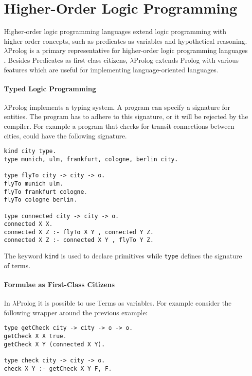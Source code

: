 

\section{Higher-Order Logic Programming}
\label{higher-order-logic-programming}
Higher-order logic programming languages extend logic programming with higher-order concepts, such as predicates as variables and hypothetical reasoning. $\lambda$Prolog is a primary representative for higher-order logic programming languages \cite{miller_programming_2012}. Besides Predicates as first-class citizens, $\lambda$Prolog extends Prolog with various features which are useful for implementing language-oriented languages.


\paragraph{Typed Logic Programming}
$\lambda$Prolog implements a typing system. A program can specify a signature for entities. The program has to adhere to this signature, or it will be rejected by the compiler. For example a program that checks for transit connections between cities, could have the following signature.

\begin{lstlisting}
kind city type.
type munich, ulm, frankfurt, cologne, berlin city.

type flyTo city -> city -> o.
flyTo munich ulm.
flyTo frankfurt cologne.
flyTo cologne berlin.

type connected city -> city -> o.
connected X X.
connected X Z :- flyTo X Y , connected Y Z.
connected X Z :- connected X Y , flyTo Y Z.
\end{lstlisting}

The keyword \lstinline{kind} is used to declare primitives while \lstinline{type} defines the signature of terms. 

\paragraph{Formulae as First-Class Citizens}
In $\lambda$Prolog it is possible to use Terms as variables. For example consider the following wrapper around the previous example:

\begin{lstlisting}
type getCheck city -> city -> o -> o.
getCheck X X true.
getCheck X Y (connected X Y).

type check city -> city -> o.
check X Y :- getCheck X Y F, F.
\end{lstlisting}

